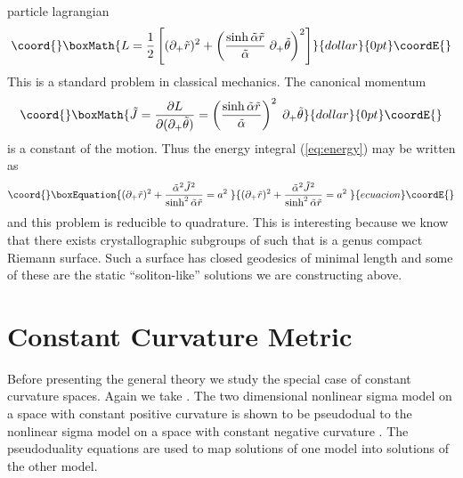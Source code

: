 \documentclass[a4paper,12pt]{article}
\DeclareMathOperator{\SL}{SL}
\providecommand{\alphatil}{\tilde{\alpha}}
\providecommand{\half}{\frac{1}{2}}
\providecommand{\bbR}{\mathbb{R}}
\providecommand{\rtil}{\tilde{r}}
\providecommand{\thetatil}{\tilde{\theta}}
\begin{document}
particle lagrangian
$$\coord{}\boxMath{
	L = \half\left[ (\partial_{+}\rtil)^{2} + 
	\left(\frac{\sinh\alphatil\rtil}{\alphatil}\; 
	\partial_{+}\thetatil\right)^{2} \right]
}{dollar}{0pt}\coordE{}$$
This is a standard problem in classical mechanics. The canonical 
momentum
$$\coord{}\boxMath{
	\tilde{J} = \frac{\partial
	L}{\partial(\partial_{+}\thetatil)} =
	\left(\frac{\sinh\alphatil\rtil}{\alphatil} \right)^{2}\;
	\partial_{+}\thetatil
}{dollar}{0pt}\coordE{}$$
is a constant of the motion. Thus the energy integral 
(\ref{eq:energy}) may be written as
\begin{equation}\coord{}\boxEquation{
    (\partial_{+}\rtil)^{2} +
    \frac{\alphatil^{2}\tilde{J}^{2}}{\sinh^{2}\alphatil\rtil} =
    a^{2}\;
}{
    (\partial_{+}\rtil)^{2} +
    \frac{\alphatil^{2}\tilde{J}^{2}}{\sinh^{2}\alphatil\rtil} =
    a^{2}\;
}{ecuacion}\coordE{}\end{equation}
and this problem is reducible to quadrature.  This is interesting
because we know that there exists crystallographic subgroups \myHighlight{$\Gamma$}\coordHE{}
of \myHighlight{$\SL(2,\bbR)$}\coordHE{} such that \coordHE{} is a genus \coordHE{} compact Riemann
surface.  Such a surface has closed geodesics of minimal length and
some of these are the static ``soliton-like'' solutions 
\myHighlight{$(\rtil(2\sigma),\thetatil(2\sigma))$}\coordHE{} we are
constructing above.

\section{Constant Curvature Metric}
\label{sec:constant}

Before presenting the general theory we study the special case of
constant curvature spaces.  Again we take \coordHE{}. 
The two dimensional nonlinear sigma model on a space with constant
positive curvature \coordHE{} is shown to be pseudodual to the nonlinear
sigma model on a space with constant negative curvature \coordHE{}. 
The pseudoduality equations are used to map solutions of one model into
solutions of the other model.
\end{document}
